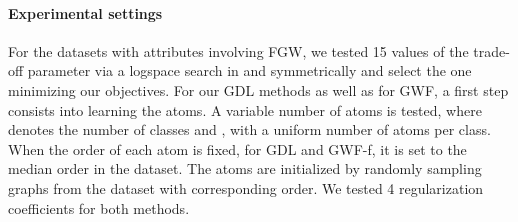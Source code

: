 \documentclass{article}
\begin{document}
	\begin{table*}[t!]
		\caption{Clustering: Rand Index computed for benchmarked approaches on real datasets.}
		\label{tab:clustering}
		\begin{center}
		\end{center}
	\end{table*}
	
	\paragraph{Experimental settings} For the datasets with attributes involving FGW, we tested 15 values of the trade-off parameter  via a logspace search in  and symmetrically
	 and select the one minimizing our objectives.
	For our GDL methods as well as for GWF, a first step consists into learning the atoms.
	A variable number of  atoms is tested, where  denotes the number of classes and , with a uniform number of atoms per class. 
	When the order  of each atom is fixed, for GDL and GWF-f, it is set to the
	median order in the dataset. The atoms are initialized by randomly sampling graphs from
	the dataset with corresponding order. We tested 4 regularization coefficients for both methods.
	
\end{document}
